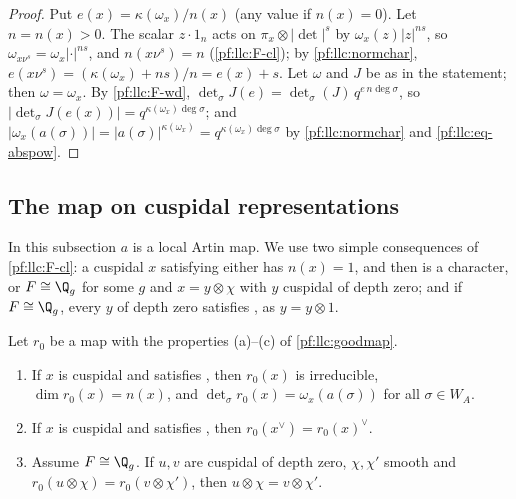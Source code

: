 \begin{proof}
Put $e(x)=\kappa(\omega_x)/n(x)$ (any value if $n(x)=0$). Let $n=n(x)>0$. The scalar $z\cdot1_n$ acts on
$\pi_x\otimes|\det|^s$ by $\omega_x(z)|z|^{ns}$, so $\omega_{x\nu^s}=\omega_x|\cdot|^{ns}$, and $n(x\nu^s)=n$ (\ref{pf:llc:F-cl});
by \cref{pf:llc:normchar}, $e(x\nu^s)=(\kappa(\omega_x)+ns)/n=e(x)+s$. Let $\omega$ and $J$ be as in the statement; then
$\omega=\omega_x$. By \ref{pf:llc:F-wd}, $\det_\sigma J(e)=\det_\sigma(J)\,q^{e\,n\deg\sigma}$, so $|\det_\sigma J(e(x))|=
q^{\kappa(\omega_x)\deg\sigma}$; and $|\omega_x(a(\sigma))|=|a(\sigma)|^{\kappa(\omega_x)}=q^{\kappa(\omega_x)\deg\sigma}$ by
\cref{pf:llc:normchar} and \eqref{pf:llc:eq-abspow}.
\end{proof}

\subsection{The map on cuspidal representations}\label{pf:llc:sec-cusp}

In this subsection $a$ is a local Artin map. We use two simple consequences of \ref{pf:llc:F-cl}: a cuspidal $x$
satisfying \llcGo{} either has $n(x)=1$, and then is a character, or $F\cong\Q_g$ for some $g$ and $x=y\otimes\chi$ with
$y$ cuspidal of depth zero; and if $F\cong\Q_g$, every $y$ of depth zero satisfies \llcGo{}, as $y=y\otimes1$.

\begin{lemma}\label{pf:llc:gm}
Let $r_0$ be a map with the properties (a)--(c) of \cref{pf:llc:goodmap}.
\begin{enumerate}[label=(\alph*)]
\item If $x$ is cuspidal and satisfies \llcGo{}, then $r_0(x)$ is irreducible, $\dim r_0(x)=n(x)$, and $\det_\sigma
  r_0(x)=\omega_x(a(\sigma))$ for all $\sigma\in W_A$.
\item If $x$ is cuspidal and satisfies \llcGo{}, then $r_0(x^\vee)=r_0(x)^\vee$.
\item Assume $F\cong\Q_g$. If $u,v$ are cuspidal of depth zero, $\chi,\chi'$ smooth and $r_0(u\otimes\chi)=r_0(v\otimes\chi')$,
  then $u\otimes\chi=v\otimes\chi'$.
\end{enumerate}
\end{lemma}

